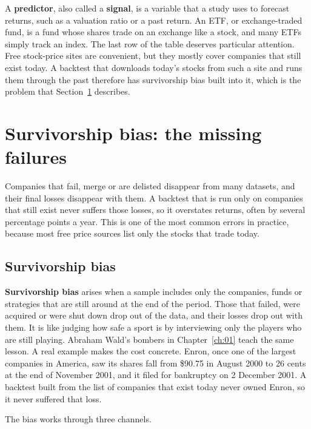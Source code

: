 A \textbf{predictor}, also called a \textbf{signal}, is a variable that a study uses to forecast returns, such as a valuation ratio or a past return. An ETF, or exchange-traded fund, is a fund whose shares trade on an exchange like a stock, and many ETFs simply track an index. The last row of the table deserves particular attention. Free stock-price sites are convenient, but they mostly cover companies that still exist today. A backtest that downloads today's stocks from such a site and runs them through the past therefore has survivorship bias built into it, which is the problem that Section~\ref{sec:02-survivorship} describes.

\section{Survivorship bias: the missing failures}
\label{sec:02-survivorship}

Companies that fail, merge or are delisted disappear from many datasets, and their final losses disappear with them. A backtest that is run only on companies that still exist never suffers those losses, so it overstates returns, often by several percentage points a year. This is one of the most common errors in practice, because most free price sources list only the stocks that trade today.

\subsection{Survivorship bias}

\textbf{Survivorship bias} arises when a sample includes only the companies, funds or strategies that are still around at the end of the period. Those that failed, were acquired or were shut down drop out of the data, and their losses drop out with them. It is like judging how safe a sport is by interviewing only the players who are still playing. Abraham Wald's bombers in Chapter~\ref{ch:01} teach the same lesson. A real example makes the cost concrete. Enron, once one of the largest companies in America, saw its shares fall from \$90.75 in August 2000 to 26 cents at the end of November 2001, and it filed for bankruptcy on 2 December 2001. A backtest built from the list of companies that exist today never owned Enron, so it never suffered that loss.

The bias works through three channels.

